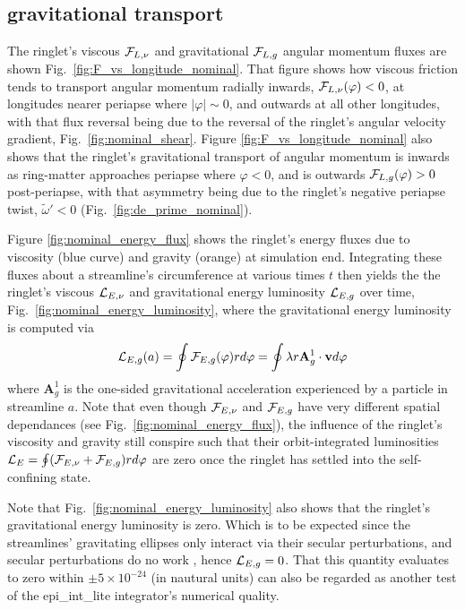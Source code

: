 \documentclass[preprint]{aastex62}
\begin{document}
\subsection{gravitational transport}
\label{subsec:gravitational_flux}

The ringlet's viscous ${\cal F}_{L,\nu}$ and gravitational ${\cal F}_{L,g}$
angular momentum fluxes are shown Fig.\ \ref{fig:F_vs_longitude_nominal}. That figure
shows how viscous friction tends to transport angular momentum radially inwards, ${\cal F}_{L,\nu}(\varphi)<0$, 
at longitudes nearer periapse where $|\varphi|\sim0$, and outwards
at all other longitudes, with that flux reversal being due to the
reversal of the ringlet's angular velocity gradient, Fig.\ \ref{fig:nominal_shear}. 
Figure \ref{fig:F_vs_longitude_nominal} also shows that the ringlet's gravitational
transport of angular momentum is inwards as
ring-matter approaches periapse where $\varphi<0$, 
and is outwards ${\cal F}_{L,g}(\varphi)>0$ post-periapse, with that asymmetry being due to the ringlet's
negative periapse twist, $\tilde{\omega}'<0$ (Fig.\ \ref{fig:de_prime_nominal}).

Figure \ref{fig:nominal_energy_flux} shows the ringlet's energy fluxes 
due to viscosity (blue curve) and gravity (orange) at simulation end.
Integrating these fluxes about a streamline's circumference at various times $t$ then yields the
the ringlet's viscous ${\cal L}_{E,\nu}$ and gravitational energy luminosity ${\cal L}_{E,g}$ over time,
Fig.\ \ref{fig:nominal_energy_luminosity}, where the gravitational energy luminosity is computed via
\begin{equation}
    \label{eqn:L_g}
    {\cal L}_{E,g}(a) = \oint {\cal F}_{E,g}(\varphi)rd\varphi = \oint \lambda r\mathbf{A}^1_g\cdot\mathbf{v}d\varphi
\end{equation}
where $\mathbf{A}^1_g$ is the one-sided gravitational acceleration experienced by a particle in streamline $a$.
Note that even though ${\cal F}_{E,\nu}$ and ${\cal F}_{E,g}$ have very different spatial dependances 
(see Fig.\ \ref{fig:nominal_energy_flux}),
the influence of the ringlet's viscosity and gravity still conspire such that their
orbit-integrated luminosities ${\cal L}_{E}=\oint ({\cal F}_{E,\nu}+{\cal F}_{E,g})rd\varphi$ are zero 
once the ringlet has settled into the self-confining state.

Note that Fig.\ \ref{fig:nominal_energy_luminosity} also shows that 
the ringlet's gravitational energy luminosity is zero. Which is to be expected since 
the streamlines' gravitating ellipses only interact via their secular
perturbations, and secular perturbations do no work \citep{BC61}, hence ${\cal L}_{E,g}=0$.
That this quantity evaluates to zero within $\pm5\times10^{-24}$ (in nautural units) can also be regarded
as another test of the epi\_int\_lite integrator's numerical quality.
\end{document}

